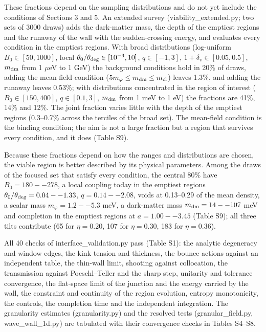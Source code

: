 \documentclass[preprint,12pt]{elsarticle}
\begin{document}
These fractions depend on the sampling distributions and do not yet include the conditions of Sections 3 and 5. An extended survey (viability\_extended.py; two sets of 3000 draws) adds the dark-matter mass, the depth of the emptiest regions and the runaway of the wall with the sudden-crossing energy, and evaluates every condition in the emptiest regions. With broad distributions (log-uniform $B_0\in[50,1000]$, local $\theta_0/\theta_{\rm deg}\in[10^{-3},10]$, $q\in[-1,3]$, $1+\delta_v\in[0.05,0.5]$, $m_{\rm dm}$ from 1 $\mu$eV to 1 GeV) the background conditions hold in 20\% of draws, adding the mean-field condition ($5m_\varphi\le m_{\rm dm}\le m_{\rm cl}$) leaves 1.3\%, and adding the runaway leaves 0.53\%; with distributions concentrated in the region of interest ($B_0\in[150,400]$, $q\in[0.1,3]$, $m_{\rm dm}$ from 1 meV to 1 eV) the fractions are 41\%, 14\% and 12\%. The joint fraction varies little with the depth of the emptiest regions (0.3--0.7\% across the terciles of the broad set). The mean-field condition is the binding condition; the aim is not a large fraction but a region that survives every condition, and it does (Table S9).

Because these fractions depend on how the ranges and distributions are chosen, the viable region is better described by its physical parameters. Among the draws of the focused set that satisfy every condition, the central 80\% have $B_0=180--278$, a local coupling today in the emptiest regions $\theta_0/\theta_{\rm deg}=0.04--1.33$, $q=0.14--2.08$, voids at 0.13--0.29 of the mean density, a scalar mass $m_\varphi=1.2--5.3$ meV, a dark-matter mass $m_{\rm dm}=14--107$ meV and completion in the emptiest regions at $a=1.00--3.45$ (Table S9); all three tilts contribute (65 for $\eta=0.20$, 107 for $\eta=0.30$, 183 for $\eta=0.36$).

All 40 checks of interface\_validation.py pass (Table S1): the analytic degeneracy and window edges, the kink tension and thickness, the bounce actions against an independent table, the thin-wall limit, shooting against collocation, the transmission against Poeschl--Teller and the sharp step, unitarity and tolerance convergence, the flat-space limit of the junction and the energy carried by the wall, the constraint and continuity of the region evolution, entropy monotonicity, the controls, the completion time and the independent integration. The granularity estimates (granularity.py) and the resolved tests (granular\_field.py, wave\_wall\_1d.py) are tabulated with their convergence checks in Tables S4--S8.
\end{document}
